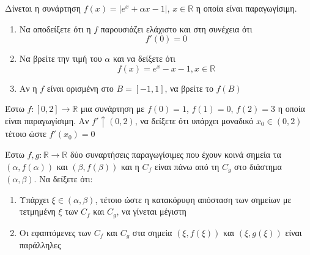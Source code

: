 \documentclass{presentation}
\begin{document}
\begin{askisi}
  Δίνεται η συνάρτηση $f(x)=|e^x+αx-1|$, $x\in\mathbb{R}$ η οποία είναι παραγωγίσιμη.
  \begin{enumerate}
    \item<1-> Να αποδείξετε ότι η $f$ παρουσιάζει ελάχιστο και στη συνέχεια ότι
          $$f'(0)=0$$
    \item<2-> Να βρείτε την τιμή του $α$ και να δείξετε ότι
          $$f(x)=e^x-x-1,x\in\mathbb{R}$$
    \item<3-> Αν η $f$ είναι ορισμένη στο $Β=[-1,1]$, να βρείτε το $f(Β)$
  \end{enumerate}

\end{askisi}

\begin{askisi}
  Έστω $f:[0,2]\to\mathbb{R}$ μια συνάρτηση με $f(0)=1$, $f(1)=0$, $f(2)=3$ η οποία είναι παραγωγίσιμη. Αν $f'\uparrow (0,2)$, να δείξετε ότι υπάρχει μοναδικό $x_0\in (0,2)$ τέτοιο ώστε $f'(x_0)=0$

\end{askisi}

\begin{askisi}
  Έστω $f,g:\mathbb{R}\to\mathbb{R}$ δύο συναρτήσεις παραγωγίσιμες που έχουν κοινά σημεία τα $(α,f(α))$ και $(β,f(β))$ και η $C_f$ είναι πάνω από τη $C_g$ στο διάστημα $(α,β)$. Να δείξετε ότι:
  \begin{enumerate}
    \item<1-> Υπάρχει $ξ\in (α,β)$, τέτοιο ώστε η κατακόρυφη απόσταση των σημείων με τετμημένη $ξ$ των $C_f$ και $C_g$, να γίνεται μέγιστη
    \item<2-> Οι εφαπτόμενες των $C_f$ και $C_g$ στα σημεία $(ξ,f(ξ))$ και $(ξ,g(ξ))$ είναι παράλληλες
  \end{enumerate}

\end{askisi}


\appendix
\end{document}
